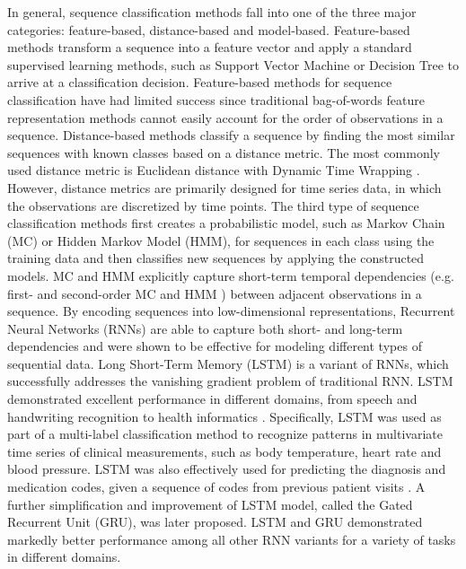 \documentclass{amia_summit_2018}
\begin{document}
In general, sequence classification methods fall into one of the three major categories: feature-based, distance-based and model-based. Feature-based methods transform a sequence into a feature
vector and apply a standard supervised learning methods, such as Support Vector Machine \cite{leslie2004fast} or Decision Tree \cite{chuzhanova1998feature} to arrive at a classification decision.
Feature-based methods for sequence classification have had limited success since traditional bag-of-words feature representation methods cannot easily account for the order of observations in a
sequence.
Distance-based methods classify a sequence by finding the most similar sequences with known classes based on a distance metric. The most commonly used distance metric is
Euclidean distance with Dynamic Time Wrapping \cite{keogh2000scaling}. However, distance metrics are primarily designed for time series data, in which the observations are discretized by time points.
The third type of sequence classification methods first creates a probabilistic model, such as Markov Chain (MC) or Hidden Markov Model \cite{rabiner1989tutorial} (HMM), for sequences in each class
using the training data and then classifies new sequences by applying the constructed models. MC and HMM explicitly capture short-term temporal dependencies (e.g. first- and second-order MC and HMM
\cite{kundu1988recognition}) between adjacent observations in a sequence. By encoding sequences into low-dimensional representations, Recurrent Neural Networks (RNNs) are able to capture both short-
and long-term dependencies and were shown to be effective for modeling different types of sequential data. Long Short-Term Memory (LSTM) \cite{hochreiter1997long} is a variant of RNNs, which
successfully addresses the vanishing gradient problem \cite{bengio1993problem} of traditional RNN. LSTM demonstrated excellent performance in different domains, from speech \cite{graves2013speech} and
handwriting \cite{nion2013handwritten} recognition to health informatics \cite{lipton2015learning, choi2016doctor}. Specifically, LSTM was used as part of a multi-label classification method to
recognize patterns in multivariate time series of clinical measurements, such as body temperature, heart rate and blood pressure\cite{lipton2015learning}. LSTM was also effectively used for predicting
the diagnosis and medication codes, given a sequence of codes from previous patient visits \cite{choi2016doctor}. A further simplification and improvement of LSTM model, called the Gated Recurrent
Unit\cite{chung2014empirical} (GRU), was later proposed. LSTM and GRU demonstrated markedly better performance among all other RNN variants for a variety of tasks in different domains.
  
\end{document}

